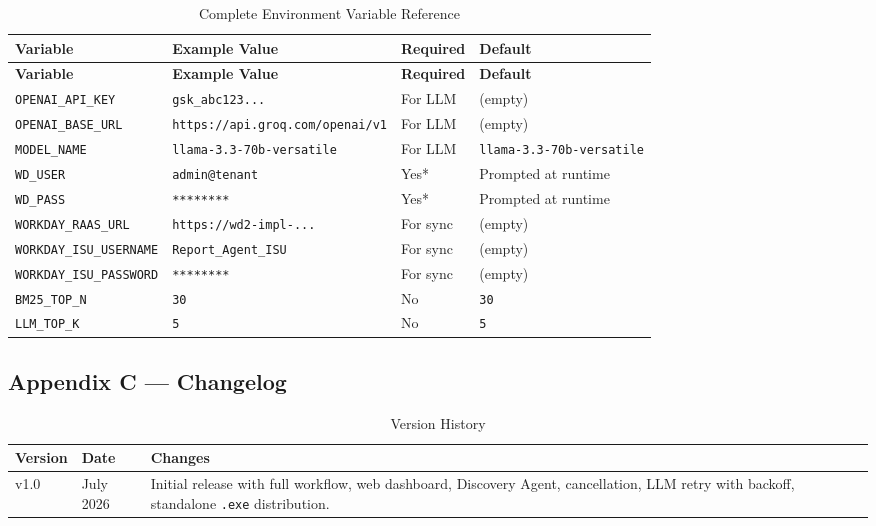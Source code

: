 \documentclass[12pt,a4paper]{article}
\begin{document}
\begin{longtable}{p{4cm} p{4cm} p{2cm} p{3.5cm}}
\caption{Complete Environment Variable Reference} \label{tab:env-full} \\
\toprule
\textbf{Variable} & \textbf{Example Value} & \textbf{Required} & \textbf{Default} \\
\midrule
\endfirsthead
\toprule
\textbf{Variable} & \textbf{Example Value} & \textbf{Required} & \textbf{Default} \\
\midrule
\endhead
\texttt{OPENAI\_API\_KEY} & \texttt{gsk\_abc123...} & For LLM & (empty) \\
\midrule
\texttt{OPENAI\_BASE\_URL} & \texttt{https://api.groq.com/openai/v1} & For LLM & (empty) \\
\midrule
\texttt{MODEL\_NAME} & \texttt{llama-3.3-70b-versatile} & For LLM & \texttt{llama-3.3-70b-versatile} \\
\midrule
\texttt{WD\_USER} & \texttt{admin@tenant} & Yes* & Prompted at runtime \\
\midrule
\texttt{WD\_PASS} & \texttt{********} & Yes* & Prompted at runtime \\
\midrule
\texttt{WORKDAY\_RAAS\_URL} & \texttt{https://wd2-impl-...} & For sync & (empty) \\
\midrule
\texttt{WORKDAY\_ISU\_USERNAME} & \texttt{Report\_Agent\_ISU} & For sync & (empty) \\
\midrule
\texttt{WORKDAY\_ISU\_PASSWORD} & \texttt{********} & For sync & (empty) \\
\midrule
\texttt{BM25\_TOP\_N} & \texttt{30} & No & \texttt{30} \\
\midrule
\texttt{LLM\_TOP\_K} & \texttt{5} & No & \texttt{5} \\
\bottomrule
\end{longtable}

\subsection{Appendix C --- Changelog}
\label{subsec:changelog}

\begin{table}[H]
\centering
\caption{Version History}
\label{tab:changelog}
\begin{tabularx}{\textwidth}{l l X}
\toprule
\textbf{Version} & \textbf{Date} & \textbf{Changes} \\
\midrule
v1.0 & July 2026 & Initial release with full workflow, web dashboard, Discovery Agent, cancellation, LLM retry with backoff, standalone \texttt{.exe} distribution. \\
\bottomrule
\end{tabularx}
\end{table}

\end{document}
